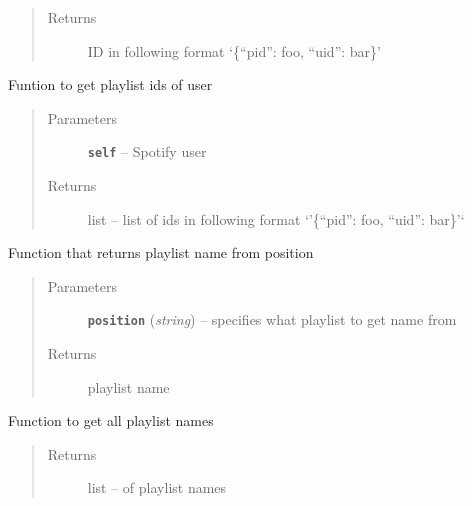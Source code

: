 \documentclass[letterpaper,10pt,english]{sphinxmanual}
\begin{document}
\begin{fulllineitems}
\begin{fulllineitems}
\begin{quote}
\begin{description}
\item[{Returns}] \leavevmode
ID in following format `\{``pid'': foo, ``uid'': bar\}'

\end{description}\end{quote}

\end{fulllineitems}


\begin{fulllineitems}
\label{code:gitsound.SpotifyUser.get_playlist_ids}
Funtion to get playlist ids of user
\begin{quote}\begin{description}
\item[{Parameters}] \leavevmode
\textbf{\texttt{self}} -- Spotify user

\item[{Returns}] \leavevmode
list -- list of ids in following format `'\{``pid'': foo, ``uid'': bar\}'`

\end{description}\end{quote}

\end{fulllineitems}


\begin{fulllineitems}
\label{code:gitsound.SpotifyUser.get_playlist_name}
Function that returns playlist name from position
\begin{quote}\begin{description}
\item[{Parameters}] \leavevmode
\textbf{\texttt{position}} (\emph{string}) -- specifies what playlist to get name from

\item[{Returns}] \leavevmode
playlist name

\end{description}\end{quote}

\end{fulllineitems}


\begin{fulllineitems}
\label{code:gitsound.SpotifyUser.get_playlist_names}
Function to get all playlist names
\begin{quote}\begin{description}
\item[{Returns}] \leavevmode
list -- of playlist names


\end{description}
\end{quote}
\end{fulllineitems}
\end{fulllineitems}
\end{document}
